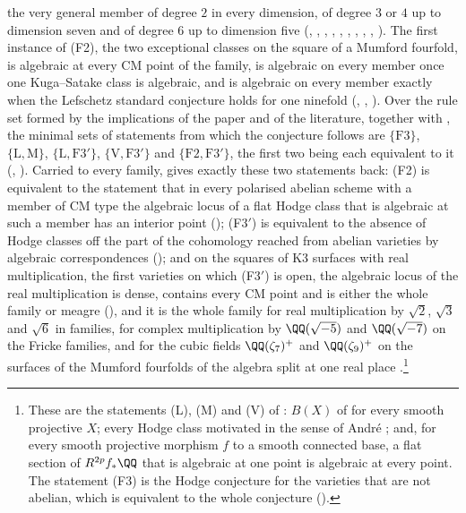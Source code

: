\begin{theorem}[Closure]
\begin{enumerate}[label=\textup{(\roman*)},leftmargin=2.8em,itemsep=4pt]
  the very general member of degree $2$ in every dimension, of degree $3$ or
  $4$ up to dimension seven and of degree $6$ up to dimension five
  (, ,
  , ,
  , , ,
  , ,
  ). The first instance of
  \textup{(F2)}, the two exceptional classes on the square of a Mumford
  fourfold, is algebraic at every CM point of the family, is algebraic on
  every member once one Kuga--Satake class is algebraic, and is algebraic on
  every member exactly when the Lefschetz standard conjecture holds for one
  ninefold (, ,
  ). Over the rule set formed by the implications of
  the paper and of the literature, together with , the
  minimal sets of statements from which the conjecture follows are
  $\{\mathrm{F3}\}$, $\{\mathrm{L},\mathrm{M}\}$,
  $\{\mathrm{L},\mathrm{F3}'\}$, $\{\mathrm{V},\mathrm{F3}'\}$ and
  $\{\mathrm{F2},\mathrm{F3}'\}$, the first two being each equivalent to it
  (, ). Carried to every family,
  \cite[Theorem~1.1]{paperI} gives exactly these two statements back:
  \textup{(F2)} is equivalent to the statement that in every polarised
  abelian scheme with a member of CM type the algebraic locus of a flat
  Hodge class that is algebraic at such a member has an interior point
  (); \textup{(F3$'$)} is equivalent to the absence
  of Hodge classes off the part of the cohomology reached from abelian
  varieties by algebraic correspondences (); and on the
  squares of K3 surfaces with real multiplication, the first varieties on
  which \textup{(F3$'$)} is open, the algebraic locus of the real
  multiplication is dense, contains every CM point and is either the whole
  family or meagre (), and it is the whole family for
  real multiplication by $\sqrt2$, $\sqrt3$ and $\sqrt6$ in families, for
  complex multiplication by $\QQ(\sqrt{-5})$ and $\QQ(\sqrt{-7})$ on the
  Fricke families, and for the cubic fields $\QQ(\zeta_{7})^{+}$ and
  $\QQ(\zeta_{9})^{+}$ on the surfaces of the Mumford fourfolds of the
  algebra split at one real place \cite{BB26dense}.\footnote{These are the statements
  \textup{(L)}, \textup{(M)} and \textup{(V)} of : $B(X)$ of
  \cite[Definition~10.6]{paperI} for every smooth projective $X$; every Hodge class
  motivated in the sense of Andr\'e \cite[\S2.1]{And96b}; and, for every
  smooth projective morphism $f$ to a smooth connected base, a flat section of
  $R^{2p}f_{*}\QQ$ that is algebraic at one point is algebraic at every
  point. The statement (F3) is the Hodge conjecture for the varieties that
  are not abelian, which is equivalent to the whole conjecture
  ().}
\end{enumerate}
\end{theorem}

